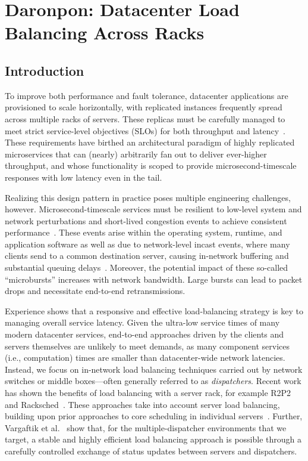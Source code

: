 \chapter{Daronpon: Datacenter Load Balancing Across Racks}
\label{daronpon:chap}

\newcommand{\daronpon}[0]{Daronpon\xspace}

\section{Introduction}
\label{daronpon:sec:intro}

To improve both performance and fault tolerance, datacenter
applications are provisioned to scale horizontally, with replicated
instances frequently spread across multiple racks of servers.  These
replicas must be carefully managed to meet strict service-level
objectives (SLOs) for both throughput and
latency~\cite{killer_microseconds,tail_at_scale}. These requirements
have birthed an architectural paradigm of highly replicated
microservices that can (nearly) arbitrarily fan out to deliver
ever-higher throughput, and whose functionality is scoped to provide
microsecond-timescale responses with low latency even in the tail.

Realizing this design pattern in practice poses multiple engineering
challenges, however.  Microsecond-timescale services must be resilient
to low-level system and network perturbations and short-lived
congestion events to achieve consistent
performance~\cite{facebook_microburst}.  These events arise within the
operating system, runtime, and application software as well as due to
network-level incast events, where many clients send to a
common destination server, causing in-network buffering and
substantial queuing delays~\cite{facebook_memcache}.  Moreover, the
potential impact of these so-called ``microbursts'' increases with
network bandwidth.  Large bursts can lead to packet drops and
necessitate end-to-end retransmissions.

Experience shows that a responsive and effective load-balancing
strategy is key to managing overall service latency.  Given the
ultra-low service times of many modern datacenter services, end-to-end
approaches driven by the clients and servers themselves are unlikely
to meet demands, as many component services (i.e., computation) times
are smaller than datacenter-wide network latencies. Instead, we focus
on in-network load balancing techniques carried out by network
switches or middle boxes---often generally referred to as
\textit{dispatchers}.  Recent work has shown the benefits of load balancing
with a server rack, for example R2P2~\cite{r2p2} and
Racksched~\cite{racksched}.  These approaches take into account server
load balancing, building upon prior approaches to core scheduling in
individual servers~\cite{IX,shinjuku,shenango,seda}. Further,
Vargaftik et al.~\cite{lsq} show that, for the multiple-dispatcher
environments that we target, a stable and highly efficient load
balancing approach is possible through a carefully controlled exchange
of status updates between servers and dispatchers.

